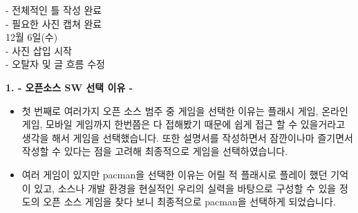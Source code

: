 \documentclass{article}
\begin{document}
 - 전체적인 틀 작성 완료\\
 
 - 필요한 사진 캡쳐 완료\\
 
 12월 6일(수)\\
 
 - 사진 삽입 시작\\
 
 - 오탈자 및 글 흐름 수정\\

\flushleft
\begin{large}\textbf{1. - 오픈소스 SW 선택 이유 -}\end{large}
\begin{itemize}

\item 첫 번째로 여러가지 오픈 소스 범주 중 게임을 선택한 이유는 플래시 게임, 온라인 게임, 모바일 게임까지 한번쯤은 다 접해봤기 때문에 쉽게 접근 할 수 있을거라고 생각을 해서 게임을 선택했습니다. 또한 설명서를 작성하면서 잠깐이나마 즐기면서 작성할 수 있다는 점을 고려해 최종적으로 게임을 선택하였습니다.\\

\item 여러 게임이 있지만 pacman을 선택한 이유는 어릴 적 플래시로 플레이 했던 기억이 있고, 소스나 개발 환경을 현실적인 우리의 실력을 바탕으로 구성할 수 있을 정도의 오픈 소스 게임을 찾다 보니 최종적으로 pacman을 선택하게 되었습니다.

\end{itemize}
\end{document}
